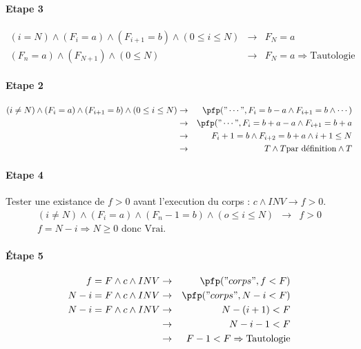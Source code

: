 \paragraph{Etape 3}
\begin{eqnarray*}
	(i = N) \wedge (F_i = a) \wedge (F_{i+1} = b) \wedge (0 \leq i \leq N) &\rightarrow& F_N = a\\
	(F_n = a) \wedge (F_{N+1}) \wedge (0 \leq N) &\rightarrow& F_N = a \Rightarrow \textrm{Tautologie}
\end{eqnarray*}

\paragraph{Etape 2}
\begin{eqnarray*}
	(i \neq N) \wedge (F_i = a) \wedge (F_{i+1} = b) \wedge (0 \leq i \leq N) &\rightarrow& \pfp("\cdots", F_i=b-a \wedge F_{i+1} = b \wedge \cdots)\\
	&\rightarrow& \pfp ("\cdots", F_i = b+a - a \wedge F_{i+1} = b+a\\
	&\rightarrow& F_i+1 = b \wedge F_{i+2} = b + a \wedge i+1 \leq N\\
	&\rightarrow& T \wedge T \textrm{par définition} \wedge T 
\end{eqnarray*}

\paragraph{Etape 4}
Tester une existance de $f > 0$ avant l'execution du corps : $c \wedge INV \rightarrow f > 0$.
\begin{eqnarray*}
	(i \neq  N) \wedge (F_i = a) \wedge (F_n-1 = b) \wedge (o \leq i \leq N) &\rightarrow& f > 0\\
	 f = N-i \Rightarrow N \geq 0\textrm{ donc Vrai.}
\end{eqnarray*}

\paragraph{\'Etape 5}
\begin{eqnarray*}
f = F \wedge c \wedge INV &\rightarrow& \pfp("corps", f < F)\\
	N-i = F \wedge c \wedge INV &\rightarrow& \pfp("corps", N-i < F)\\
	N - i = F \wedge c \wedge INV &\rightarrow& N - (i+1) < F\\
	&\rightarrow& N -i-1 < F \\
	&\rightarrow& F-1 < F \Rightarrow \textrm{Tautologie}
\end{eqnarray*}

